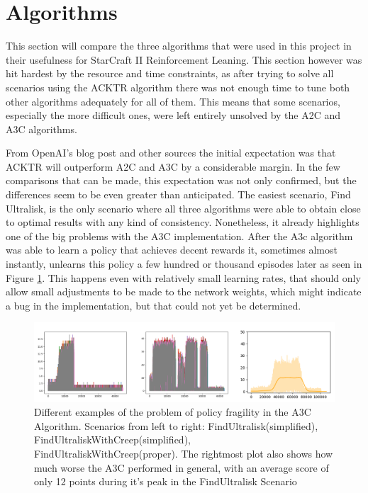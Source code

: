 \section{Algorithms}
\label{sec:eval_algo}

This section will compare the three algorithms that were used in this project in their usefulness for StarCraft II Reinforcement Leaning. This section however was hit hardest by the resource and time constraints, as after trying to solve all scenarios using the ACKTR algorithm there was not enough time to tune both other algorithms adequately for all of them. This means that some scenarios, especially the more difficult ones, were left entirely unsolved by the A2C and A3C algorithms.

From OpenAI's blog post \citep{openaiblog-a2c} and other sources the initial expectation was that ACKTR will outperform A2C and A3C by a considerable margin. In the few comparisons that can be made, this expectation was not only confirmed, but the differences seem to be even greater than anticipated. The easiest scenario, Find Ultralisk, is the only scenario where all three algorithms were able to obtain close to optimal results with any kind of consistency. Nonetheless, it already highlights one of the big problems with the A3C implementation. After the A3c algorithm was able to learn a policy that achieves decent rewards it, sometimes almost instantly, unlearns this policy a few hundred or thousand episodes later as seen in Figure \ref{fig:a3c_unlearn}. This happens even with relatively small learning rates, that should only allow small adjustments to be made to the network weights, which might indicate a bug in the implementation, but that could not yet be determined.    
\begin{figure}[htb]
  \centering
      \includegraphics[width=1\textwidth]{Figures/plots/a3c_unlearning.png}
  \caption{Different examples of the problem of policy fragility in the A3C Algorithm. Scenarios from left to right: FindUltralisk(simplified), FindUltraliskWithCreep(simplified), FindUltraliskWithCreep(proper). The rightmost plot also shows how much worse the A3C performed in general, with an average score of only 12 points during it's peak in  the FindUltralisk Scenario}
  \label{fig:a3c_unlearn}
\end{figure}

